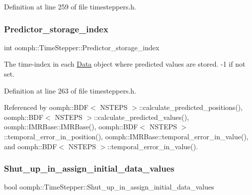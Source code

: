 Definition at line 259 of file timesteppers.\+h.

\mbox{\label{classoomph_1_1TimeStepper_af91eb510f32a9d072399f37389853174}} 
\subsubsection{\texorpdfstring{Predictor\+\_\+storage\+\_\+index}{Predictor\_storage\_index}}
{\footnotesize\ttfamily int oomph\+::\+Time\+Stepper\+::\+Predictor\+\_\+storage\+\_\+index\hspace{0.3cm}{\ttfamily [protected]}}



The time-\/index in each \hyperlink{classoomph_1_1Data}{Data} object where predicted values are stored. -\/1 if not set. 



Definition at line 263 of file timesteppers.\+h.



Referenced by oomph\+::\+B\+D\+F$<$ N\+S\+T\+E\+P\+S $>$\+::calculate\+\_\+predicted\+\_\+positions(), oomph\+::\+B\+D\+F$<$ N\+S\+T\+E\+P\+S $>$\+::calculate\+\_\+predicted\+\_\+values(), oomph\+::\+I\+M\+R\+Base\+::\+I\+M\+R\+Base(), oomph\+::\+B\+D\+F$<$ N\+S\+T\+E\+P\+S $>$\+::temporal\+\_\+error\+\_\+in\+\_\+position(), oomph\+::\+I\+M\+R\+Base\+::temporal\+\_\+error\+\_\+in\+\_\+value(), and oomph\+::\+B\+D\+F$<$ N\+S\+T\+E\+P\+S $>$\+::temporal\+\_\+error\+\_\+in\+\_\+value().

\mbox{\label{classoomph_1_1TimeStepper_a1a8928784f3903a8f0f3f5e2400fa430}} 
\subsubsection{\texorpdfstring{Shut\+\_\+up\+\_\+in\+\_\+assign\+\_\+initial\+\_\+data\+\_\+values}{Shut\_up\_in\_assign\_initial\_data\_values}}
{\footnotesize\ttfamily bool oomph\+::\+Time\+Stepper\+::\+Shut\+\_\+up\+\_\+in\+\_\+assign\+\_\+initial\+\_\+data\+\_\+values\hspace{0.3cm}{\ttfamily [protected]}}



